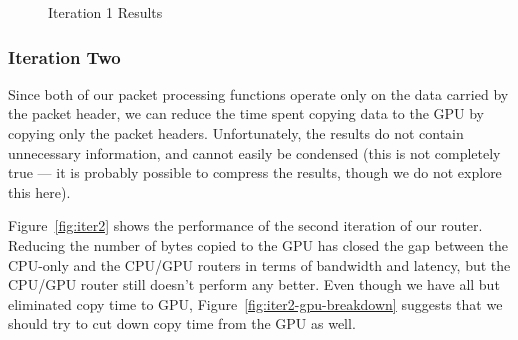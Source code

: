 \begin{figure}
	
	\medskip

    \caption{Iteration 1 Results}
	\label{fig:iter1}
\end{figure}


\subsubsection{Iteration Two}

Since both of our packet processing functions operate only on the data carried
by the packet header, we can reduce the time spent copying data to the GPU by
copying only the packet headers. Unfortunately, the results do not contain
unnecessary information, and cannot easily be condensed (this is not completely
true --- it is probably possible to compress the results, though we do not
explore this here).

Figure~\ref{fig:iter2} shows the performance of the second iteration of our
router. Reducing the number of bytes copied to the GPU has closed the gap
between the CPU-only and the CPU/GPU routers in terms of bandwidth and latency,
but the CPU/GPU router still doesn't perform any better. Even though we have
all but eliminated copy time to GPU, Figure~\ref{fig:iter2-gpu-breakdown}
suggests that we should try to cut down copy time from the GPU as well.

